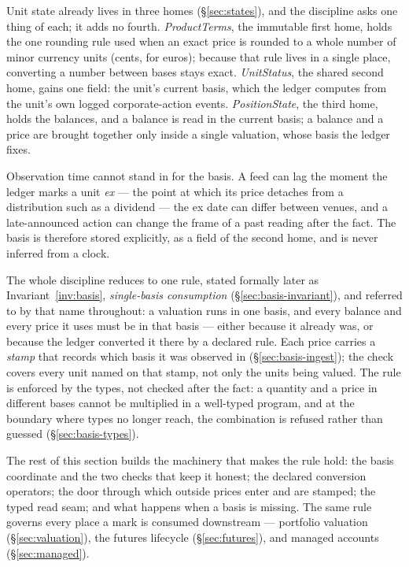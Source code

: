 Unit state already lives in three homes (\S\ref{sec:states}), and the discipline asks one thing
of each; it adds no fourth. \emph{ProductTerms}, the immutable first home, holds the one rounding
rule used when an exact price is rounded to a whole number of minor currency units (cents, for euros); because that rule lives in a single
place, converting a number between bases stays exact. \emph{UnitStatus}, the shared second home,
gains one field: the unit's current basis, which the ledger computes from the unit's own logged
corporate-action events. \emph{PositionState}, the third home, holds the balances, and a balance
is read in the current basis; a balance and a price are brought together only inside a single
valuation, whose basis the ledger fixes.

Observation time cannot stand in for the basis. A feed can lag the moment the ledger marks a
unit \emph{ex} --- the point at which its price detaches from a distribution such as a dividend
--- the ex date can differ between venues, and a late-announced action can change the frame of a
past reading after the fact. The basis is therefore stored explicitly, as a field of the second home, and is
never inferred from a clock.

The whole discipline reduces to one rule, stated formally later as Invariant~\ref{inv:basis},
\emph{single-basis consumption} (\S\ref{sec:basis-invariant}), and referred to by that name
throughout: a valuation runs in one basis, and every balance and every price it uses must be in
that basis --- either because it already was, or because the ledger converted it there by a
declared rule. Each price carries a \emph{stamp} that records which basis it was observed in (\S\ref{sec:basis-ingest}); the check covers every unit named on that stamp, not only the units being
valued. The rule is enforced by the types, not checked after the fact: a quantity and a price in
different bases cannot be multiplied in a well-typed program, and at the boundary where types no
longer reach, the combination is refused rather than guessed (\S\ref{sec:basis-types}).

The rest of this section builds the machinery that makes the rule hold: the basis coordinate and
the two checks that keep it honest; the declared conversion operators; the door through which
outside prices enter and are stamped; the typed read seam; and what happens when a basis is
missing. The same rule governs every place a mark is consumed downstream --- portfolio valuation
(\S\ref{sec:valuation}), the futures lifecycle (\S\ref{sec:futures}), and managed accounts
(\S\ref{sec:managed}).

